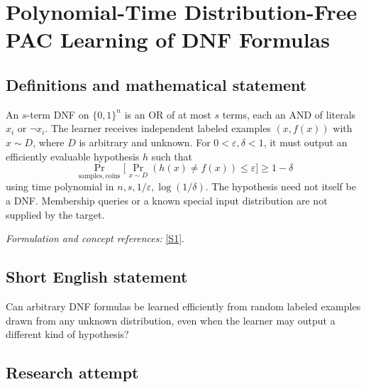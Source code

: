 \documentclass[11pt,a4paper]{article}
\newcommand{\eps}{\varepsilon}
\newcommand{\sref}[2]{\hyperlink{source:#1:#2}{[S#2]}}
\newif\ifshowcatalogue
\newcommand{\cataloguescope}[1]{\ifshowcatalogue
 \paragraph{Exact scope in the supplied catalogue.}
 \begin{quote}\small #1\end{quote}\fi}
\numberwithin{equation}{section}
\begin{document}
\setcounter{section}{0}
\clearpage
\section*{\texorpdfstring{Polynomial-Time Distribution-Free PAC Learning of DNF Formulas}{Polynomial-Time Distribution-Free PAC Learning of DNF Formulas}}\label{statement}
\subsection{Definitions and mathematical statement}
An $s$-term DNF on $\{0,1\}^n$ is an OR of at most $s$ terms, each an AND of literals $x_i$ or $\neg x_i$. The learner receives independent labeled examples $(x,f(x))$ with $x\sim D$, where $D$ is arbitrary and unknown. For $0<\eps,\delta<1$, it must output an efficiently evaluable hypothesis $h$ such that
\[
 \Pr_{\mathrm{samples,coins}}\bigl[\Pr_{x\sim D}(h(x)\ne f(x))\le\eps\bigr]\ge1-\delta
\]
using time polynomial in $n,s,1/\eps,\log(1/\delta)$. The hypothesis need not itself be a DNF. Membership queries or a known special input distribution are not supplied by the target.
\par\smallskip\textit{Formulation and concept references:} \sref{statement}{1}.
\cataloguescope{Given an unknown s-term DNF f on \{0,1\}\textasciicircum{}n and random labeled examples drawn from an arbitrary unknown distribution D, construct a possibly improper hypothesis in time polynomial in n, s, 1/epsilon, and log(1/delta) whose D-error is at most epsilon with probability at least 1-delta.}
\subsection{Short English statement}
Can arbitrary DNF formulas be learned efficiently from random labeled examples drawn from any unknown distribution, even when the learner may output a different kind of hypothesis?
\subsection{Research attempt}
\end{document}
